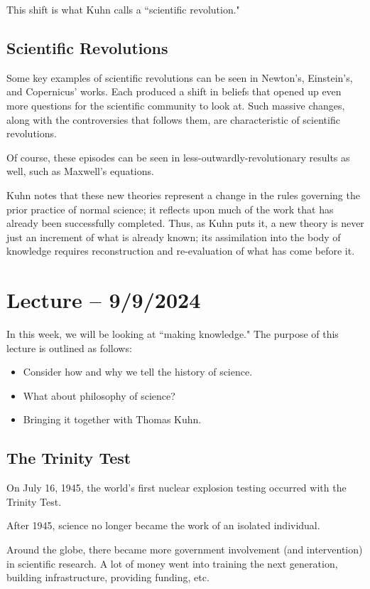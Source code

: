 \documentclass[openany]{book}
\begin{document}
This shift is what Kuhn calls a ``scientific revolution."

\subsection{Scientific Revolutions}
Some key examples of scientific revolutions can be seen in Newton's, Einstein's, and Copernicus' works. Each produced a shift in beliefs that opened up even more questions for the scientific community to look at. Such massive changes, along with the controversies that follows them, are characteristic of scientific revolutions.

Of course, these episodes can be seen in less-outwardly-revolutionary results as well, such as Maxwell's equations.

Kuhn notes that these new theories represent a change in the rules governing the prior practice of normal science; it reflects upon much of the work that has already been successfully completed. Thus, as Kuhn puts it, a new theory is never just an increment of what is already known; its assimilation into the body of knowledge requires reconstruction and re-evaluation of what has come before it.


\section{Lecture -- 9/9/2024}
In this week, we will be looking at ``making knowledge." The purpose of this lecture is outlined as follows:
\begin{itemize}
	\item Consider how and why we tell the history of science.
	\item What about philosophy of science?
	\item Bringing it together with Thomas Kuhn.
\end{itemize}

\subsection{The Trinity Test}
On July 16, 1945, the world's first nuclear explosion testing occurred with the Trinity Test.

After 1945, science no longer became the work of an isolated individual.

Around the globe, there became more government involvement (and intervention) in scientific research. A lot of money went into training the next generation, building infrastructure, providing funding, etc.
\end{document}
